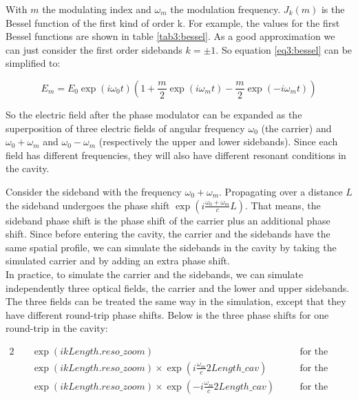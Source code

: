 With $m$ the modulating index and $\omega_m$ the modulation frequency. $J_k(m)$ is the Bessel function of the first kind of order k. For example, the values for the first Bessel functions are shown in table \ref{tab3:bessel}. As a good approximation we can just consider the first order sidebands $k = \pm 1$. So equation \ref{eq3:bessel} can be simplified to:

\begin{equation}
E_m = E_0 \exp(i \omega_0 t) (1 + \frac{m}{2} \exp(i \omega_m t) -  \frac{m}{2} \exp(-i \omega_m t))
\end{equation}

So the electric field after the phase modulator can be expanded as the superposition of three electric fields of angular frequency $\omega_0$ (the carrier) and $\omega_0 + \omega_m$ and $\omega_0 - \omega_m$ (respectively the upper and lower sidebands). Since each field has different frequencies, they will also have different resonant conditions in the cavity.

Consider the sideband with the frequency $\omega_0 + \omega_m$. Propagating over a distance $L$ the sideband undergoes the phase shift $ \exp(i \frac{\omega_0 + \omega_m}{c} L)$. That means, the sideband phase shift is the phase shift of the carrier plus an additional phase shift. Since before entering the cavity, the carrier and the sidebands have the same spatial profile, we can simulate the sidebands in the cavity by taking the simulated carrier and by adding an extra phase shift.\\

In practice, to simulate the carrier and the sidebands, we can simulate independently three optical fields, the carrier and the lower and upper sidebands. The three fields can be treated the same way in the simulation, except that they have different round-trip phase shifts. Below is the three phase shifts for one round-trip in the cavity:

\begin{alignat}{2}
    \quad & \exp(i k Length.reso\_zoom) &\quad&   \text{for the carrier} \nonumber \\
    \quad & \exp(i k Length.reso\_zoom) \times \exp\left(i \frac{\omega_m}{c} 2 Length\_cav\right) && \text{for the upper sidebands} \nonumber \\
    \quad & \exp(i k Length.reso\_zoom) \times \exp\left(-i \frac{\omega_m}{c} 2 Length\_cav\right) && \text{for the lower sidebands}
\label{eq3:sid23}
\end{alignat}

